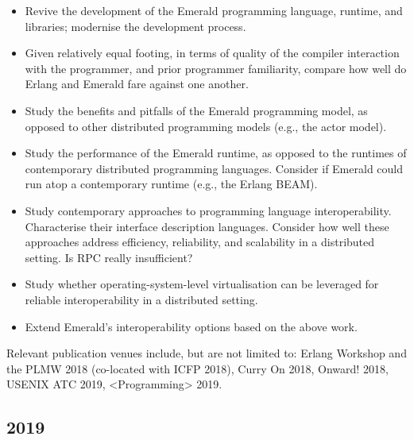 \begin{itemize}

\item Revive the development of the Emerald programming language,
runtime, and libraries; modernise the development process.

\item Given relatively equal footing, in terms of quality of the
compiler interaction with the programmer, and prior programmer
familiarity, compare how well do Erlang and Emerald fare against one
another.

\item Study the benefits and pitfalls of the Emerald programming
model, as opposed to other distributed programming models (e.g., the
actor model).

\item Study the performance of the Emerald runtime, as opposed to the
runtimes of contemporary distributed programming languages. Consider
if Emerald could run atop a contemporary runtime (e.g., the Erlang
BEAM).

\item Study contemporary approaches to programming language
interoperability. Characterise their interface description languages.
Consider how well these approaches address efficiency, reliability,
and scalability in a distributed setting. Is RPC really insufficient?

\item Study whether operating-system-level virtualisation can be
leveraged for reliable interoperability in a distributed setting.

\item Extend Emerald's interoperability options based on the above
work.

\end{itemize}

\noindent Relevant publication venues include, but are not limited to:
Erlang Workshop and the PLMW 2018 (co-located with ICFP 2018), Curry
On 2018, Onward! 2018, USENIX ATC 2019, <Programming> 2019.

\subsection*{2019}

